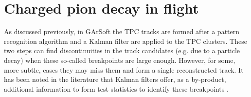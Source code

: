 \section{Charged pion decay in flight}\label{section:pi_decay}

As discussed previously, in GArSoft the TPC tracks are formed after a pattern recognition algorithm and a Kalman filter are applied to the TPC clusters. These two steps can find discontinuities in the track candidates (e.g. due to a particle decay) when these so-called breakpoints are large enough. However, for some, more subtle, cases they may miss them and form a single reconstructed track. It has been noted in the literature that Kalman filters offer, as a by-product, additional information to form test statistics to identify these breakpoints \cite{Fruehwirth1988, Astier2000}.

